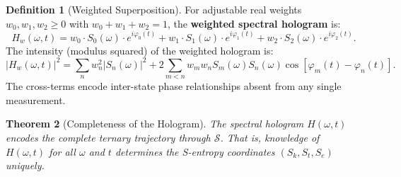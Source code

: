 \documentclass[11pt,twocolumn,a4paper]{article}
\newtheorem{theorem}{Theorem}[section]
\theoremstyle{definition}
\newtheorem{definition}[theorem]{Definition}
\theoremstyle{remark}
\newcommand{\Sk}{S_k}
\newcommand{\St}{S_t}
\newcommand{\Se}{S_e}
\newcommand{\Sspace}{\mathcal{S}}
\begin{document}
\begin{definition}[Weighted Superposition]
\label{def:weighted}
For adjustable real weights $w_0, w_1, w_2 \geq 0$ with $w_0 + w_1 + w_2 = 1$, the \textbf{weighted spectral hologram} is:
\begin{equation}
H_w(\omega, t) = w_0 \cdot S_0(\omega) \cdot e^{i\varphi_0(t)} + w_1 \cdot S_1(\omega) \cdot e^{i\varphi_1(t)} + w_2 \cdot S_2(\omega) \cdot e^{i\varphi_2(t)}.
\end{equation}
The intensity (modulus squared) of the weighted hologram is:
\begin{equation}
\label{eq:hologram_intensity}
|H_w(\omega,t)|^2 = \sum_{n} w_n^2 |S_n(\omega)|^2 + 2\sum_{m < n} w_m w_n S_m(\omega) S_n(\omega) \cos[\varphi_m(t) - \varphi_n(t)].
\end{equation}
The cross-terms encode inter-state phase relationships absent from any single measurement.
\end{definition}

\begin{theorem}[Completeness of the Hologram]
\label{thm:complete}
The spectral hologram $H(\omega, t)$ encodes the complete ternary trajectory through $\Sspace$. That is, knowledge of $H(\omega, t)$ for all $\omega$ and $t$ determines the S-entropy coordinates $(\Sk, \St, \Se)$ uniquely.
\end{theorem}
\end{document}
